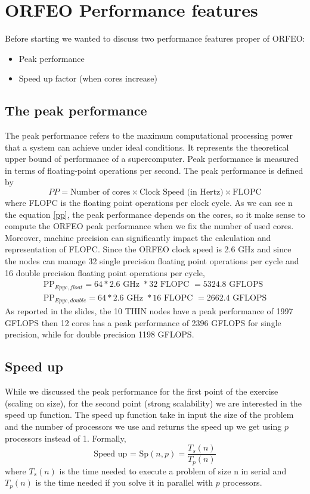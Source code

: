 \documentclass{article}
\begin{document}
\section{ORFEO Performance features}
Before starting we wanted to discuss two performance features proper of ORFEO:
\begin{itemize}
    \item Peak performance 
    \item Speed up factor (when cores increase)
\end{itemize}

\subsection{The peak performance}
The peak performance refers to the maximum computational processing power that a system can achieve under ideal conditions. It represents the theoretical upper bound of performance of a supercomputer. Peak performance is measured in terms of floating-point operations per second.
The peak performance is defined by
\begin{equation}
\label{pp}
PP = \text{Number of cores} \times \text{Clock Speed (in Hertz)} \times \text{FLOPC}    
\end{equation}
where FLOPC is the floating point operations per clock cycle.
As we can see n the equation \ref{pp}, the peak performance depends on the cores, so it make sense to compute the ORFEO peak performance when we fix the number of used cores.
Moreover, machine precision can significantly impact the calculation and representation of FLOPC.
Since the ORFEO clock speed is 2.6 GHz and since the nodes can manage 32 single precision floating point operations per cycle and 16 double precision floating point operations per cycle,
\begin{align}
\text{PP}_{Epyc,float} =   64 * 2.6 \text{ GHz } * 32 \text{ FLOPC }  = 5324.8 \text{ GFLOPS}\\
\text{PP}_{Epyc,double} =  64 * 2.6 \text{ GHz } * 16 \text{ FLOPC }  = 2662.4 \text{ GFLOPS}
\end{align}
As reported in the slides, the 10 THIN nodes have a peak performance of 1997 GFLOPS then 12 cores has a peak performance of 2396 GFLOPS for single precision, while for double precision 1198 GFLOPS.

\subsection{Speed up}
While we discussed the peak performance for the first point of the exercise (scaling on size), for the second point (strong scalability) we are interested in the speed up function. 
The speed up function take in input the size of the problem and the number of processors we use and returns the speed up we get using $p$ processors instead of 1. Formally,
\begin{equation}
    \text{Speed up = } \text{Sp}(n,p) = \frac{T_s(n)}{T_p(n)}
\end{equation}
where $T_s(n)$ is the time needed to execute a problem of size n in serial and $T_p(n)$ is the time needed if you solve it in parallel with $p$ processors.
\end{document}
